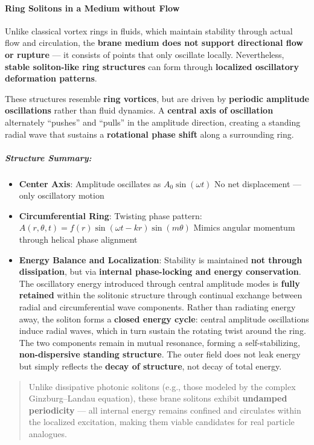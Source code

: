 \paragraph{Ring Solitons in a Medium without
Flow}\label{ring-solitons-in-a-medium-without-flow}

Unlike classical vortex rings in fluids, which maintain stability
through actual flow and circulation, the \textbf{brane medium does not
support directional flow or rupture} --- it consists of points that only
oscillate locally. Nevertheless, \textbf{stable soliton-like ring
structures} can form through \textbf{localized oscillatory deformation
patterns}.

These structures resemble \textbf{ring vortices}, but are driven by
\textbf{periodic amplitude oscillations} rather than fluid dynamics. A
\textbf{central axis of oscillation} alternately ``pushes'' and
``pulls'' in the amplitude direction, creating a standing radial wave
that sustains a \textbf{rotational phase shift} along a surrounding
ring.

\subparagraph{Structure Summary:}\label{structure-summary}

\begin{itemize}
\item
  \textbf{Center Axis}: Amplitude oscillates as $A_0 \sin(\omega t)$
  No net displacement --- only oscillatory motion
\item
  \textbf{Circumferential Ring}: Twisting phase pattern:
  $A(r,\theta,t) = f(r) \sin(\omega t - k r) \sin(m\theta)$ Mimics
  angular momentum through helical phase alignment
\item
  \textbf{Energy Balance and Localization}: Stability is maintained
  \textbf{not through dissipation}, but via \textbf{internal
  phase-locking and energy conservation}. The oscillatory energy
  introduced through central amplitude modes is \textbf{fully retained}
  within the solitonic structure through continual exchange between
  radial and circumferential wave components. Rather than radiating
  energy away, the soliton forms a \textbf{closed energy cycle}: central
  amplitude oscillations induce radial waves, which in turn sustain the
  rotating twist around the ring. The two components remain in mutual
  resonance, forming a self-stabilizing, \textbf{non-dispersive standing
  structure}. The outer field does not leak energy but simply reflects
  the \textbf{decay of structure}, not decay of total energy.
\end{itemize}

\begin{quote}
Unlike dissipative photonic solitons (e.g., those modeled by the complex
Ginzburg--Landau equation), these brane solitons exhibit
\textbf{undamped periodicity} --- all internal energy remains confined
and circulates within the localized excitation, making them viable
candidates for real particle analogues.
\end{quote}

